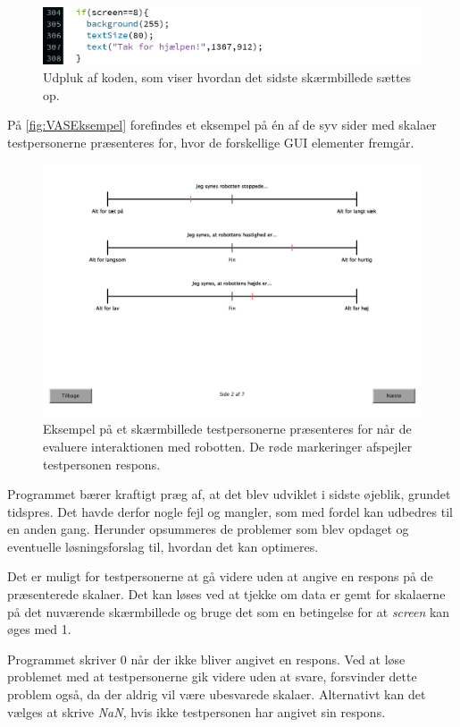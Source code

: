 %
\begin{figure}[H]
\centering
\includegraphics[width =\textwidth]{Figure/VASProgram/Tak} 
\caption{Udpluk af koden, som viser hvordan det sidste skærmbillede sættes op.}
\label{fig:Tak}
\end{figure}
\noindent
%
På \autoref{fig:VASEksempel} forefindes et eksempel på én af de syv sider med skalaer testpersonerne præsenteres for, hvor de forskellige GUI elementer fremgår. 
%
\begin{figure}[H]
\centering
\includegraphics[width =\textwidth]{Figure/VASProgram/VASEksempel} 
\caption{Eksempel på et skærmbillede testpersonerne præsenteres for når de evaluere interaktionen med robotten. De røde markeringer afspejler testpersonen respons.}
\label{fig:VASEksempel}
\end{figure}
\noindent
%
Programmet bærer kraftigt præg af, at det blev udviklet i sidste øjeblik, grundet tidspres. Det havde derfor nogle fejl og mangler, som med fordel kan udbedres til en anden gang. Herunder opsummeres de problemer som blev opdaget og eventuelle løsningsforslag til, hvordan det kan optimeres. 

Det er muligt for testpersonerne at gå videre uden at angive en respons på de præsenterede skalaer. Det kan løses ved at tjekke om data er gemt for skalaerne på det nuværende skærmbillede og bruge det som en betingelse for at \textit{screen} kan øges med 1.

Programmet skriver 0 når der ikke bliver angivet en respons. Ved at løse problemet med at testpersonerne gik videre uden at svare, forsvinder dette problem også, da der aldrig vil være ubesvarede skalaer. Alternativt kan det vælges at skrive \textit{NaN}, hvis ikke testpersonen har angivet sin respons.

